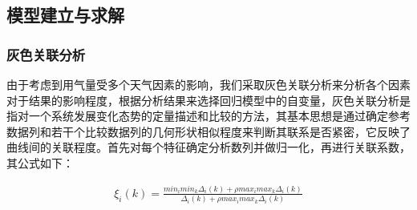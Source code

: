 \documentclass{whutmod}
\begin{document}
	\subsection{模型建立与求解}
	
	\subsubsection{灰色关联分析}
	由于考虑到用气量受多个天气因素的影响，我们采取灰色关联分析来分析各个因素对于结果的影响程度，根据分析结果来选择回归模型中的自变量，灰色关联分析是指对一个系统发展变化态势的定量描述和比较的方法，其基本思想是通过确定参考数据列和若干个比较数据列的几何形状相似程度来判断其联系是否紧密，它反映了曲线间的关联程度。首先对每个特征确定分析数列并做归一化，再进行关联系数\parencite{刘思峰2013灰色关联分析模型研究进展}，其公式如下：
	
	\begin{gather}
		\xi _{i}\left ( k \right )=\frac{min_{i} min_{k}\Delta _{i}(k)+\rho max_{i} max_{k}\Delta _{i}(k)}{\Delta _{i}(k)+\rho max_{i} max_{k}\Delta _{i}(k)}
	\end{gather}
	
\end{document}
